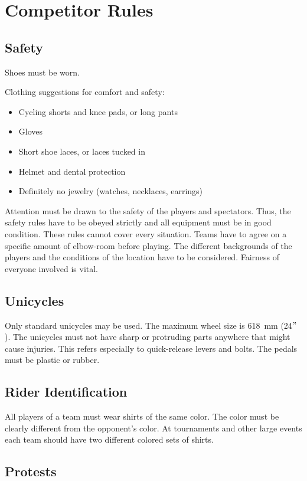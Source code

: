 \chapter{Competitor Rules}

\section{Safety}

Shoes must be worn.

Clothing suggestions for comfort and safety:
\begin{itemize}
\item Cycling shorts and knee pads, or long pants
\item Gloves
\item Short shoe laces, or laces tucked in
\item Helmet and dental protection
\item Definitely no jewelry (watches, necklaces, earrings)
\end{itemize}

Attention must be drawn to the safety of the players and spectators.
Thus, the safety rules have to be obeyed strictly and all equipment must be in good condition.
These rules cannot cover every situation.
Teams have to agree on a specific amount of elbow-room before playing.
The different backgrounds of the players and the conditions of the location have to be considered.
Fairness of everyone involved is vital.

\section{Unicycles}

Only standard unicycles may be used.
The maximum wheel size is 618~mm (24$"$).
The unicycles must not have sharp or protruding parts anywhere that might cause injuries.
This refers especially to quick-release levers and bolts.
The pedals must be plastic or rubber.

\section{Rider Identification}

All players of a team must wear shirts of the same color.
The color must be clearly different from the opponent's color.
At tournaments and other large events each team should have two different colored sets of shirts.

\section{Protests}

